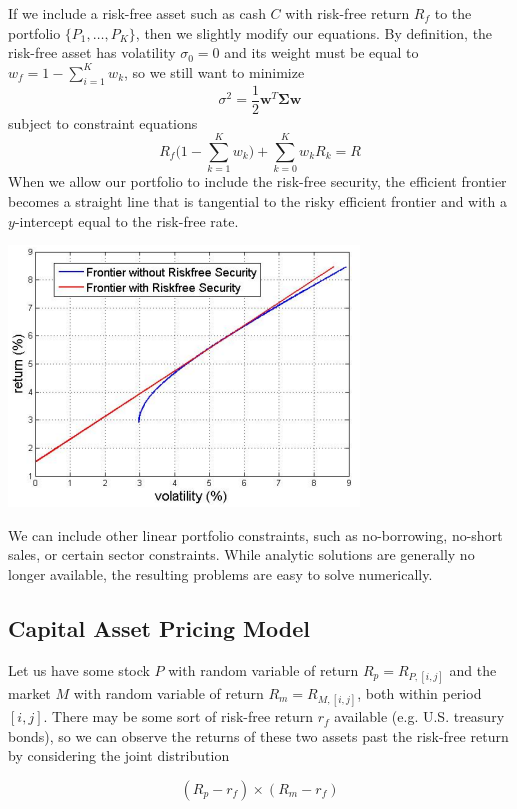 \documentclass{article}
\begin{document}
      If we include a risk-free asset such as cash $C$ with risk-free return $R_f$ to the portfolio $\{P_1, \ldots, P_K\}$, then we slightly modify our equations. By definition, the risk-free asset has volatility $\sigma_0 = 0$ and its weight must be equal to $w_f = 1 - \sum_{i=1}^K w_k$, so we still want to minimize 
      \[\sigma^2 = \frac{1}{2} \mathbf{w}^T \boldsymbol{\Sigma} \mathbf{w}\]
      subject to constraint equations 
      \[R_f \bigg( 1 - \sum_{k=1}^K w_k \bigg) + \sum_{k=0}^K w_k R_k = R\]
      When we allow our portfolio to include the risk-free security, the efficient frontier becomes a straight line that is tangential to the risky efficient frontier and with a $y$-intercept equal to the risk-free rate. 
      \begin{center}
          \includegraphics[scale=0.65]{img/Frontier_with_Risk_Free_Sec.png}
      \end{center}
      We can include other linear portfolio constraints, such as no-borrowing, no-short sales, or certain sector constraints. While analytic solutions are generally no longer available, the resulting problems are easy to solve numerically. 

  \subsection{Capital Asset Pricing Model}

    Let us have some stock $P$ with random variable of return $R_p = R_{P, [i, j]}$ and the market $M$ with random variable of return $R_m = R_{M, [i, j]}$, both within period $[i, j]$. There may be some sort of risk-free return $r_f$ available (e.g. U.S. treasury bonds), so we can observe the returns of these two assets past the risk-free return by considering the joint distribution 

    \begin{equation}
      (R_p - r_f) \times (R_m - r_f)
    \end{equation}
\end{document}
